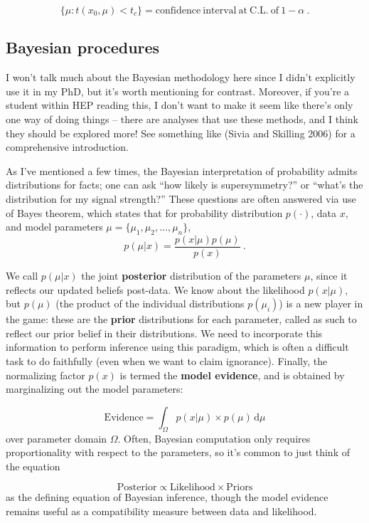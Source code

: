 \documentclass[
  11pt,
  numbers=noendperiod]{book}
\begin{document}
\[ \{\mu: t(x_0, \mu) < t_c \} = \mathrm{confidence~interval~at~C.L.~of~}1-\alpha ~.\]

\hypertarget{sec-bayes}{%
\subsection{Bayesian procedures}\label{sec-bayes}}

I won't talk much about the Bayesian methodology here since I didn't
explicitly use it in my PhD, but it's worth mentioning for contrast.
Moreover, if you're a student within HEP reading this, I don't want to
make it seem like there's only one way of doing things -- there are
analyses that use these methods, and I think they should be explored
more! See something like (Sivia and Skilling 2006) for a comprehensive
introduction.

As I've mentioned a few times, the Bayesian interpretation of
probability admits distributions for facts; one can ask ``how likely is
supersymmetry?'' or ``what's the distribution for my signal strength?''
These questions are often answered via use of Bayes theorem, which
states that for probability distribution \(p(\cdot)\), data \({x}\), and
model parameters \({\mu} = \{ \mu_1, \mu_2, \dots, \mu_n\}\), \[
p({\mu}|{x}) = \frac{p({x}|{\mu})p({\mu})}{p({x})}~.
\]

We call \(p({\mu}|{x})\) the joint \textbf{posterior} distribution of
the parameters \({\mu}\), since it reflects our updated beliefs
post-data. We know about the likelihood \(p(x|\mu)\), but \(p({\mu})\)
(the product of the individual distributions \(p(\mu_i)\)) is a new
player in the game: these are the \textbf{prior} distributions for each
parameter, called as such to reflect our prior belief in their
distributions. We need to incorporate this information to perform
inference using this paradigm, which is often a difficult task to do
faithfully (even when we want to claim ignorance). Finally, the
normalizing factor \(p({x})\) is termed the \textbf{model evidence}, and
is obtained by marginalizing out the model parameters:

\[
\mathrm{Evidence} = \int_\Omega p({x}|\mu)\times p(\mu)\,\mathrm{d}\mu
\] over parameter domain \(\Omega\). Often, Bayesian computation only
requires proportionality with respect to the parameters, so it's common
to just think of the equation

\[
\mathrm{Posterior} \propto \mathrm{Likelihood} \times \mathrm{Priors}
\] as the defining equation of Bayesian inference, though the model
evidence remains useful as a compatibility measure between data and
likelihood.
\end{document}
